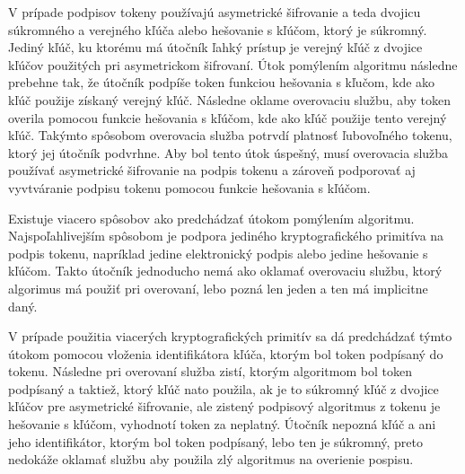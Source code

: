 V prípade podpisov tokeny používajú asymetrické šifrovanie a teda dvojicu súkromného a verejného kľúča alebo hešovanie s kľúčom, ktorý je súkromný. Jediný kľúč, ku ktorému má útočník ľahký prístup je verejný kľúč z dvojice kľúčov použitých pri asymetrickom šifrovaní. Útok pomýlením algoritmu následne prebehne tak, že útočník podpíše token funkciou hešovania s kľučom, kde ako kľúč použije získaný verejný kľúč. Následne oklame overovaciu službu, aby token overila pomocou funkcie hešovania s kľúčom, kde ako kľúč použije tento verejný kľúč. Takýmto spôsobom overovacia služba potrvdí platnosť ľubovoľného tokenu, ktorý jej útočník podvrhne. Aby bol tento útok úspešný, musí overovacia služba používať asymetrické šifrovanie na podpis tokenu a zároveň podporovať aj vyvtváranie podpisu tokenu pomocou funkcie hešovania s kľúčom.

Existuje viacero spôsobov ako predchádzať útokom pomýlením algoritmu. Najspoľahlivejším spôsobom je podpora jediného kryptografického primitíva na podpis tokenu, napríklad jedine elektronický podpis alebo jedine hešovanie s kľúčom. Takto útočník jednoducho nemá ako oklamať overovaciu službu, ktorý algorimus má použiť pri overovaní, lebo pozná len jeden a ten má implicitne daný. 

V prípade použitia viacerých kryptografických primitív sa dá predchádzať týmto útokom pomocou vloženia identifikátora kľúča, ktorým bol token podpísaný do tokenu. Následne pri overovaní služba zistí, ktorým algoritmom bol token podpísaný a taktiež, ktorý kľúč nato použila, ak je to súkromný kľúč z dvojice kľúčov pre asymetrické šifrovanie, ale zistený podpisový algoritmus z tokenu je hešovanie s kľúčom, vyhodnotí token za neplatný. Útočník nepozná kľúč a ani jeho identifikátor, ktorým bol token podpísaný, lebo ten je súkromný, preto nedokáže oklamať službu aby použila zlý algoritmus na overienie pospisu.